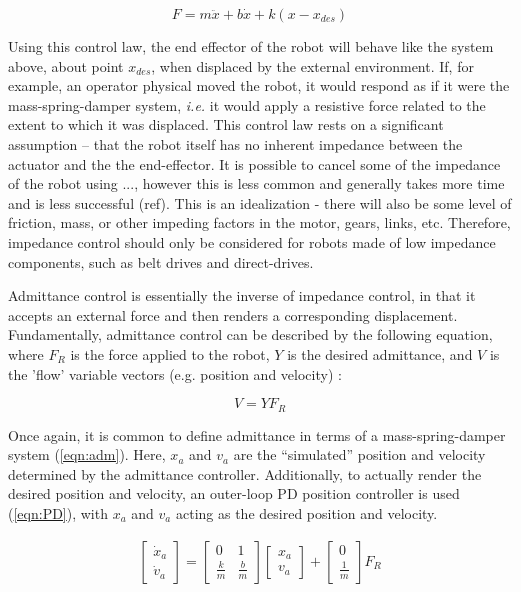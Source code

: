 \documentclass[12pt]{report}
\begin{document}
\begin{equation} \label{eqn:imp_msd}
	F = m\ddot{x} + b\dot{x} + k(x - x_{des})
\end{equation} 

Using this control law, the end effector of the robot will behave like the system above, about point $x_{des}$, when displaced by the external environment. If, for example, an operator physical moved the robot, it would respond as if it were the mass-spring-damper system, \textit{i.e.} it would apply a resistive force related to the extent to which it was displaced. 
	This control law rests on a significant assumption -- that the robot itself has no inherent impedance between the actuator and the the end-effector. It is possible to cancel some of the impedance of the robot using ..., however this is less common and generally takes more time and is less successful (ref). This is an idealization - there will also be some level of friction, mass, or other impeding factors in the motor, gears, links, etc. Therefore, impedance control should only be considered for robots made of low impedance components, such as belt drives and direct-drives. 
	
	Admittance control is essentially the inverse of impedance control, in that it accepts an external force and then renders a corresponding displacement. Fundamentally, admittance control can be described by the following equation, where $F_R$ is the force applied to the robot, $Y$ is the desired admittance, and $V$ is the 'flow' variable vectors (e.g. position and velocity) :
	
	\begin{equation}
	V = YF_R 
	\end{equation} 
	
	Once again, it is common to define admittance in terms of a mass-spring-damper system (\ref{eqn:adm}). Here, $x_a$ and $v_a$ are the ``simulated'' position and velocity determined by the admittance controller. Additionally, to actually render the desired position and velocity, an outer-loop PD position controller is used (\ref{eqn:PD}), with $x_a$ and $v_a$ acting as the desired position and velocity. 
	
	\begin{gather} \label{eqn:adm}
	\begin{bmatrix}
    	\dot{x}_a \\
    	\dot{v}_a 
    \end{bmatrix} 
    =
    \begin{bmatrix}
    	0 & 1 \\
    	\frac{k}{m} & \frac{b}{m}
    \end{bmatrix} 
    \begin{bmatrix}
    	x_a \\
    	v_a
    \end{bmatrix}  
    +
    \begin{bmatrix}
    	0 \\
    	\frac{1}{m}
    \end{bmatrix}
    F_R   	
	\end{gather}
	
\end{document}
